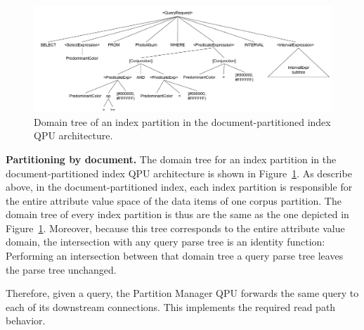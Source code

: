 \begin{figure}
  \centering
    \includegraphics[width=\textwidth]{./figures/case_studies/qpt_index_partitioning_docs.pdf}
  \caption{Domain tree of an index partition in the document-partitioned index QPU architecture.}
  \label{fig:qpt_index_partitioning_docs}
\end{figure}

\medskip
\noindent
\textbf{Partitioning by document.}
The domain tree for an index partition in the document-partitioned index QPU architecture is shown in Figure~\ref{fig:qpt_index_partitioning_docs}.
As describe above, in the document-partitioned index, each index partition is responsible for the entire attribute value space of
the data items of one corpus partition.
The domain tree of every index partition is thus are the same as the one depicted in Figure~\ref{fig:qpt_index_partitioning_docs}.
Moreover, because this tree corresponds to the entire attribute value domain,
the intersection with any query parse tree is an identity function:
Performing an intersection between that domain tree a query parse tree leaves the parse tree unchanged.

Therefore,
given a query,
the Partition Manager QPU forwards the same query to each of its downstream connections.
This implements the required read path behavior.


